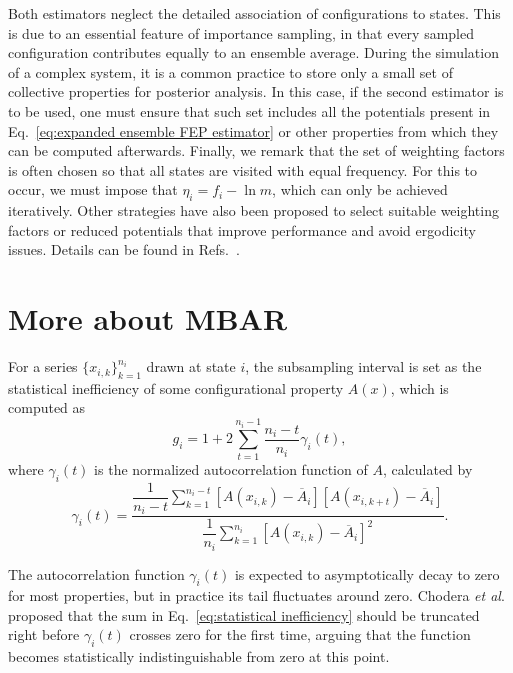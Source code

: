 \documentclass[aip,jcp,reprint,amsmath,amssymb]{revtex4-1}
\begin{document}
Both estimators neglect the detailed association of configurations to states. This is due to an essential feature of importance sampling, in that every sampled configuration contributes equally to an ensemble average. During the simulation of a complex system, it is a common practice to store only a small set of collective properties for posterior analysis. In this case, if the second estimator is to be used, one must ensure that such set includes all the potentials present in Eq.~\eqref{eq:expanded ensemble FEP estimator} or other properties from which they can be computed afterwards. Finally, we remark that the set of weighting factors is often chosen so that all states are visited with equal frequency. For this to occur, we must impose that $\eta_i = f_i - \ln m$, which can only be achieved iteratively. Other strategies have also been proposed to select suitable weighting factors or reduced potentials that improve performance and avoid ergodicity issues. Details can be found in Refs.~.

\section{More about MBAR}

For a series $\{x_{i,k}\}_{k=1}^{n_i}$ drawn at state $i$, the subsampling interval is set as the statistical inefficiency of some configurational property $A(x)$, which is computed as\cite{Chodera_2007}
\begin{equation}
\label{eq:statistical inefficiency}
g_i = 1 + 2 \sum\limits_{t=1}^{n_i-1} \frac{n_i - t}{n_i} \gamma_i(t),
\end{equation}
where $\gamma_i(t)$ is the normalized autocorrelation function of $A$, calculated by
\begin{equation*}
\gamma_i(t) = \frac{\dfrac{1}{n_i - t} \sum\limits_{k=1}^{n_i-t} \left[A(x_{i,k}) - \overline A_i\right]\left[A(x_{i,k+t}) - \overline A_i\right]}{\dfrac{1}{n_i} \sum\limits_{k=1}^{n_i} \left[A(x_{i,k}) - \overline A_i\right]^2}.
\end{equation*}

The autocorrelation function $\gamma_i(t)$ is expected to asymptotically decay to zero for most properties, but in practice its tail fluctuates around zero. Chodera \textit{et al}.\cite{Chodera_2007} proposed that the sum in Eq.~\eqref{eq:statistical inefficiency} should be truncated right before $\gamma_i(t)$ crosses zero for the first time, arguing that the function becomes statistically indistinguishable from zero at this point.
\end{document}
